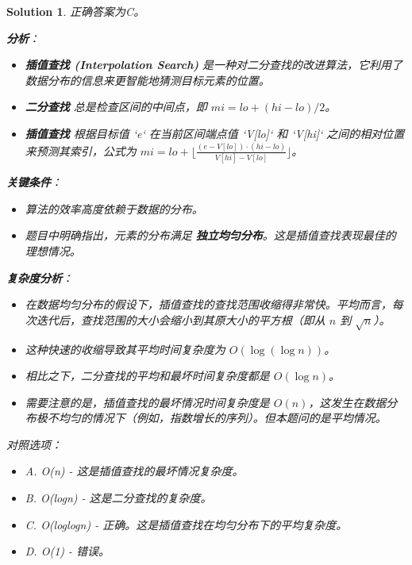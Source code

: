 \documentclass[UTF8]{report}
\newtheorem{solution}{Solution}
\theoremstyle{MyLineTheoremStyle} %
\theoremstyle{MyBlockTheoremStyle} %
\theoremstyle{MySubsubsectionStyle} %
\begin{document}
\begin{solution}
正确答案为C。

\textbf{分析}：
\begin{itemize}
    \item \textbf{插值查找 (Interpolation Search)} 是一种对二分查找的改进算法，它利用了数据分布的信息来更智能地猜测目标元素的位置。
    \item \textbf{二分查找} 总是检查区间的中间点，即 $mi = lo + (hi-lo)/2$。
    \item \textbf{插值查找} 根据目标值 `e` 在当前区间端点值 `V[lo]` 和 `V[hi]` 之间的相对位置来预测其索引，公式为 $mi = lo + \lfloor \frac{(e - V[lo]) \cdot (hi - lo)}{V[hi] - V[lo]} \rfloor$。
\end{itemize}

\textbf{关键条件}：
\begin{itemize}
    \item 算法的效率高度依赖于数据的分布。
    \item 题目中明确指出，元素的分布满足 \textbf{独立均匀分布}。这是插值查找表现最佳的理想情况。
\end{itemize}

\textbf{复杂度分析}：
\begin{itemize}
    \item 在数据均匀分布的假设下，插值查找的查找范围收缩得非常快。平均而言，每次迭代后，查找范围的大小会缩小到其原大小的平方根（即从 $n$ 到 $\sqrt{n}$）。
    \item 这种快速的收缩导致其平均时间复杂度为 $O(\log(\log n))$。
    \item 相比之下，二分查找的平均和最坏时间复杂度都是 $O(\log n)$。
    \item 需要注意的是，插值查找的最坏情况时间复杂度是 $O(n)$，这发生在数据分布极不均匀的情况下（例如，指数增长的序列）。但本题问的是平均情况。
\end{itemize}

对照选项：
\begin{itemize}
    \item A. O(n) - 这是插值查找的最坏情况复杂度。
    \item B. O(logn) - 这是二分查找的复杂度。
    \item C. O(loglogn) - 正确。这是插值查找在均匀分布下的平均复杂度。
    \item D. O(1) - 错误。
\end{itemize}
\end{solution}
\end{document}
